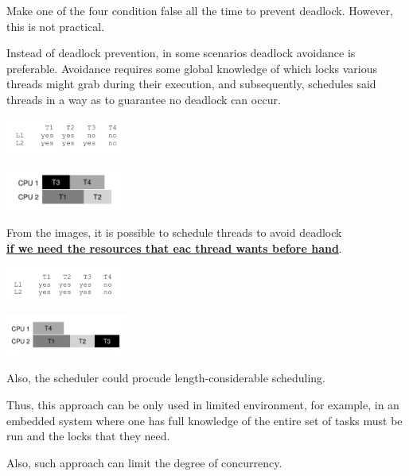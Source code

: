 
    Make one of the four condition false all the time to prevent deadlock. However,
    this is not practical. 


    Instead of deadlock prevention, in some scenarios deadlock avoidance is preferable.
    Avoidance requires some global knowledge of which locks various 
    threads might grab during their execution, and subsequently,
    schedules said threads in a way as to guarantee no deadlock can occur.


    \includegraphics[width=0.3\textwidth]{chapters/Cucurrency/Cucurrency/schedule_avoid_1.png}

    \includegraphics[width=0.3\textwidth]{chapters/Cucurrency/Cucurrency/good_schedule_1.png}


    From the images, it is possible to schedule threads to avoid deadlock\\
    \underline{\textbf{ if we need the resources that eac thread wants before hand}}.

    \includegraphics[width=0.3\textwidth]{chapters/Cucurrency/Cucurrency/deadlock_avoid_2.png}

    \includegraphics[width=0.3\textwidth]{chapters/Cucurrency/Cucurrency/schedule_2.png}

    Also, the scheduler could procude length-considerable scheduling.

    Thus, this approach can be only used in limited environment, for example,
    in an embedded system where one has full knowledge of the entire
    set of tasks must be run and the locks that they need.

    Also, such approach can limit the degree of concurrency.

